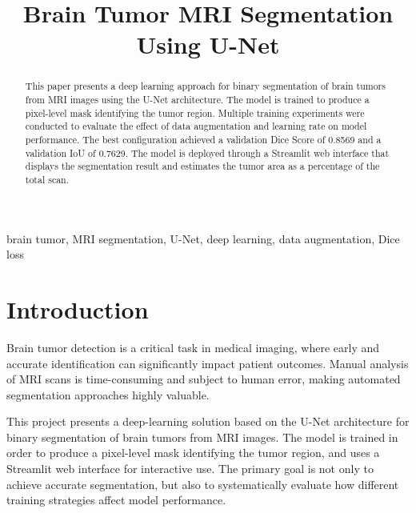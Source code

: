 \documentclass[conference]{IEEEtran}
\begin{document}
\title{Brain Tumor MRI Segmentation Using U-Net}

\author{
}

\maketitle

\begin{abstract}
This paper presents a deep learning approach for binary segmentation of brain tumors from MRI images using the U-Net architecture. The model is trained to produce a pixel-level mask identifying the tumor region. Multiple training experiments were conducted to evaluate the effect of data augmentation and learning rate on model performance. The best configuration achieved a validation Dice Score of 0.8569 and a validation IoU of 0.7629. The model is deployed through a Streamlit web interface that displays the segmentation result and estimates the tumor area as a percentage of the total scan.
\end{abstract}

\begin{IEEEkeywords}
brain tumor, MRI segmentation, U-Net, deep learning, data augmentation, Dice loss
\end{IEEEkeywords}

\section{Introduction}

Brain tumor detection is a critical task in medical imaging, where early and accurate identification can significantly impact patient outcomes. Manual analysis of MRI scans is time-consuming and subject to human error, making automated segmentation approaches highly valuable.

This project presents a deep-learning solution based on the U-Net architecture \cite{unet} for binary segmentation of brain tumors from MRI images. The model is trained in order to produce a pixel-level mask identifying the tumor region, and uses a Streamlit web interface \cite{streamlit} for interactive use. The primary goal is not only to achieve accurate segmentation, but also to systematically evaluate how different training strategies affect model performance.
\end{document}

